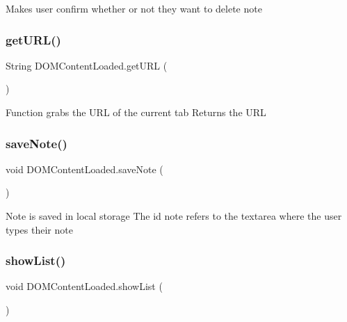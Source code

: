 Makes user confirm whether or not they want to delete note \mbox{\label{class_d_o_m_content_loaded_a03e60e64122c80b6dd06c48cc727345a}} 
\subsubsection{\texorpdfstring{get\+U\+R\+L()}{getURL()}}
{\footnotesize\ttfamily String D\+O\+M\+Content\+Loaded.\+get\+U\+RL (\begin{DoxyParamCaption}{ }\end{DoxyParamCaption})\hspace{0.3cm}{\ttfamily [inline]}}

Function grabs the U\+RL of the current tab Returns the U\+RL \mbox{\label{class_d_o_m_content_loaded_a9680fdf9c56b8536fa5788873cb7e020}} 
\subsubsection{\texorpdfstring{save\+Note()}{saveNote()}}
{\footnotesize\ttfamily void D\+O\+M\+Content\+Loaded.\+save\+Note (\begin{DoxyParamCaption}{ }\end{DoxyParamCaption})\hspace{0.3cm}{\ttfamily [inline]}}

Note is saved in local storage The id \textquotesingle{}note\textquotesingle{} refers to the textarea where the user types their note \mbox{\label{class_d_o_m_content_loaded_af7fd8c7ac1052d50a2d2b3186fa69017}} 
\subsubsection{\texorpdfstring{show\+List()}{showList()}}
{\footnotesize\ttfamily void D\+O\+M\+Content\+Loaded.\+show\+List (\begin{DoxyParamCaption}{ }\end{DoxyParamCaption})\hspace{0.3cm}{\ttfamily [inline]}}

